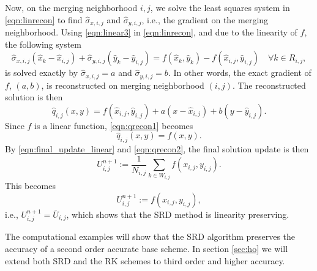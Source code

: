 Now, on the merging neighborhood $i,j$, we solve the least squares system in
\eqref{eqn:linrecon} to find $\widehat{\sigma}_{x,i,j}$ and
$\widehat{\sigma}_{y,i,j}$, i.e., the gradient on the merging neighborhood.  Using
\eqref{eqn:linear3} in \eqref{eqn:linrecon}, and due to the linearity of $f$, the following system
\begin{equation}
\widehat{\sigma}_{x,i,j}(\widehat{x}_{k} - \widehat{x}_{i,j}) + \widehat{\sigma}_{y,i,j}(\widehat{y}_{k} - \widehat{y}_{i,j})= f(\widehat{x}_k, \widehat{y}_k) - f(\widehat{x}_{i,j}, \widehat{y}_{i,j}) \quad \forall k \in R_{i,j},
\end{equation}
is solved exactly by $\widehat{\sigma}_{x,i,j}=a$ and
$\widehat{\sigma}_{y,i,j}=b$.  In other words, the exact gradient 
of $f$, $(a,b)$, is reconstructed on merging neighborhood $(i,j)$.  
The reconstructed solution is then
\begin{equation}
    \label{eqn:qrecon1}
    \hat{q}_{i,j}(x,y) = f(\widehat{x}_{i,j},\widehat{y}_{i,j}) + a(x-\widehat{x}_{i,j})+b(y-\widehat{y}_{i,j}) .
\end{equation}
Since $f$ is a linear function, \eqref{eqn:qrecon1} becomes
\begin{equation}
    \label{eqn:qrecon2}
    \hat{q}_{i,j}(x,y) = f(x,y).
\end{equation}
By \eqref{eqn:final_update_linear} and \eqref{eqn:qrecon2}, the final solution update is then
\begin{equation} 
U^{n+1}_{i,j} := \frac{1}{N_{i,j}}\sum_{k \in W_{i,j}}f(x_{i,j},y_{i,j}).
\end{equation}
This becomes
\begin{equation} 
U^{n+1}_{i,j} := f(x_{i,j},y_{i,j}),
\end{equation}
i.e., $U^{n+1}_{i,j} = \bar{U}_{i,j}$, which shows that the SRD method is linearity preserving.

The computational examples will show that the SRD algorithm preserves 
the accuracy of a second order accurate base scheme. In section \ref{sec:ho} 
we will extend both SRD and the RK
schemes to third order and higher accuracy.




